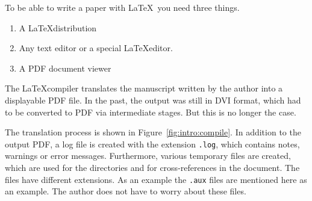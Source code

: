 To be able to write a paper with \LaTeX\ you need three things.

\begin{enumerate}
\item A \LaTeX distribution

\item Any text editor or a special \LaTeX editor.

\item A PDF document viewer
\end{enumerate}


The \LaTeX compiler translates the manuscript written by the author into a
displayable PDF file. In the past, the output was still in DVI format, which
had to be converted to PDF via intermediate stages. But this is no longer the
case.

The translation process is shown in Figure~\ref{fig:intro:compile}.
In addition to the output PDF, a log file is created with the extension \texttt{.log},
which contains notes, warnings or error messages.
Furthermore, various temporary files are created, which are used for the
directories and for cross-references in the document. The files have different
extensions. As an example the \texttt{.aux} files are mentioned here as an example.
The author does not have to worry about these files.


